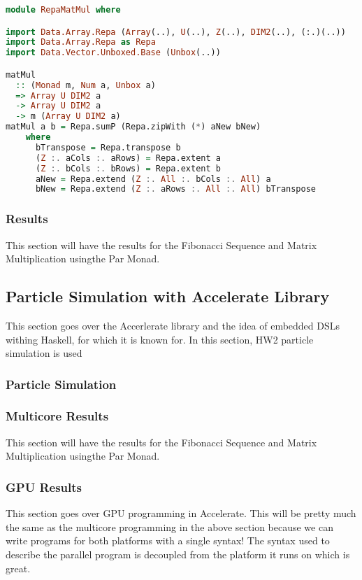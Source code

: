 \documentclass[a4paper, 10pt]{article}
\begin{document}
\begin{lstlisting}[language=Haskell, caption=Matrix multiplication using repa library]
module RepaMatMul where

import Data.Array.Repa (Array(..), U(..), Z(..), DIM2(..), (:.)(..))
import Data.Array.Repa as Repa
import Data.Vector.Unboxed.Base (Unbox(..))

matMul
  :: (Monad m, Num a, Unbox a)
  => Array U DIM2 a
  -> Array U DIM2 a
  -> m (Array U DIM2 a)
matMul a b = Repa.sumP (Repa.zipWith (*) aNew bNew)
    where
      bTranspose = Repa.transpose b
      (Z :. aCols :. aRows) = Repa.extent a
      (Z :. bCols :. bRows) = Repa.extent b
      aNew = Repa.extend (Z :. All :. bCols :. All) a
      bNew = Repa.extend (Z :. aRows :. All :. All) bTranspose
\end{lstlisting}

\subsubsection{Results}
This section will have the results for the Fibonacci Sequence and Matrix Multiplication usingthe Par Monad.

\subsection{Particle Simulation with Accelerate Library}
This section goes over the Accerlerate library and the idea of embedded DSLs withing Haskell, for which it
 is known for. In this section, HW2 particle simulation is used

\subsubsection{Particle Simulation}

\subsubsection{Multicore Results}
This section will have the results for the Fibonacci Sequence and Matrix Multiplication usingthe Par Monad.

\subsubsection{GPU Results}
This section goes over GPU programming in Accelerate. This will be pretty much the same
as the multicore programming in the above section because we can write programs for both platforms
with a single syntax! The syntax used to describe the parallel program is decoupled from the platform it runs on which is great.
\end{document}
